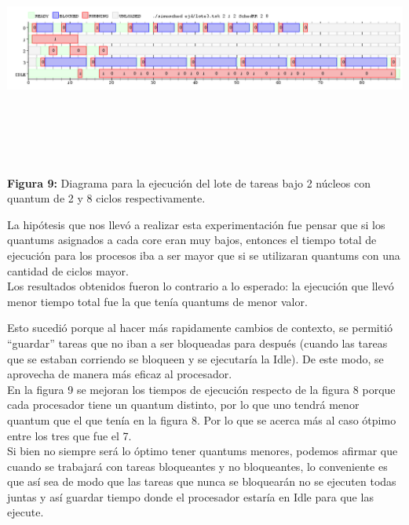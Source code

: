 \documentclass[a4paper]{article}
\begin{document}
 \includegraphics[width=\textwidth,height=3.0in,keepaspectratio]{imagenes/ej4/eje3.png} \\
\begin {flushleft}
\textbf{Figura 9:} Diagrama para la ejecuci\'on del lote de tareas bajo 2 n\'ucleos con quantum de 2 y 8 ciclos respectivamente.
\end{flushleft}

\newpage

La hipótesis que nos llev\'o a realizar esta experimentación fue pensar que si los quantums asignados a cada core eran muy bajos, entonces el tiempo total de ejecución para los procesos iba a ser mayor que si se utilizaran quantums con una cantidad de ciclos mayor. \\

Los resultados obtenidos fueron lo contrario a lo esperado: la ejecuci\'on que llev\'o menor tiempo total fue la que ten\'ia quantums de menor valor. 

Esto sucedi\'o porque al hacer m\'as rapidamente cambios de contexto, se permiti\'o ``guardar'' tareas que no iban a ser bloqueadas para despu\'es (cuando las tareas que se estaban corriendo se bloqueen y se ejecutar\'ia la Idle). De este modo, se aprovecha de manera m\'as eficaz al procesador. \\

En la figura 9 se mejoran los tiempos de ejecuci\'on respecto de la figura 8 porque cada procesador tiene un quantum distinto, por lo que uno tendr\'a  menor quantum que el que ten\'ia en la figura 8. Por lo que se acerca m\'as al caso \'otpimo entre los tres que fue el 7.\\

Si bien no siempre ser\'a lo \'optimo tener quantums menores, podemos afirmar que cuando se trabajar\'a con tareas bloqueantes y no bloqueantes, lo conveniente es que as\'i sea de modo que las tareas que nunca se bloquear\'an no se ejecuten todas juntas y as\'i guardar tiempo donde el procesador estar\'ia en Idle para que las ejecute.\\
\end{document}
